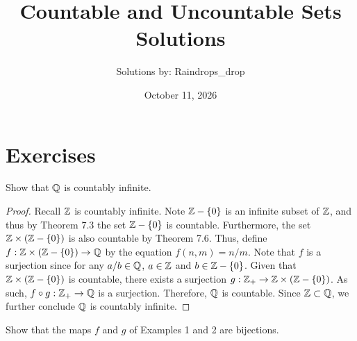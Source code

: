 \documentclass[12pt]{article}
\begin{document}
	\title{Countable and Uncountable Sets Solutions}
	\author{Solutions by: Raindrops\_drop}
	\date{October 11, 2026}
	\maketitle
	
	\section*{Exercises}

	 Show that $\mathbb{Q}$ is countably infinite.

	\begin{proof}
		Recall $\mathbb{Z}$ is countably infinite. Note $\mathbb{Z} - \{0\}$
		is an infinite subset of $\mathbb{Z}$, and thus by Theorem 7.3 the set 
		$\mathbb{Z} - \{0\}$ is countable.
		Furthermore, the set $\mathbb{Z} \times (\mathbb{Z} - \{0\})$ is also countable
		by Theorem 7.6. Thus, define $f: \mathbb{Z} \times (\mathbb{Z} - \{0\}) \to \mathbb{Q}$
		by the equation $f(n, m) = n/m$. Note that $f$ is a surjection
		since for any $a/b \in \mathbb{Q}$, $a \in \mathbb{Z}$ and $b \in \mathbb{Z} - \{0\}$.
		Given that $\mathbb{Z} \times (\mathbb{Z} - \{0\})$ is countable, there exists
		a surjection $g: \mathbb{Z}_{+} \to \mathbb{Z} \times (\mathbb{Z} - \{0\})$.
		As such, $f \circ g: \mathbb{Z}_{+} \to \mathbb{Q}$ is a surjection. Therefore,
		$\mathbb{Q}$ is countable. Since $\mathbb{Z} \subset \mathbb{Q}$, we further conclude
		$\mathbb{Q}$ is countably infinite. 
	\end{proof}

	 Show that the maps $f$ and $g$ of Examples 1 and 2
	are bijections. 
\end{document}
